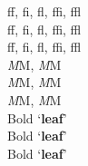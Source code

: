 \documentclass{article}
\begin{document}
	\noindent
	ff, fi, fl, ffi, ffl\\
	f\/f, f\/i, f\/l, f\/f\/i, f\/f\/l\\
	{\huge f\/f, f\/i, f\/l, f\/f\/i, f\/f\/l}\\
	
	\noindent
	{\itshape M}M, {\slshape M}M\\
	{\itshape M\/}M, {\slshape M\/}M\\
	{\huge {\itshape M\/}M, {\slshape M\/}M}\\
	
	\noindent
	Bold `{\bfseries leaf}'\\
	Bold `{\bfseries leaf\/}'\\
	{\huge Bold `{\bfseries leaf\/}'}\\
\end{document}

